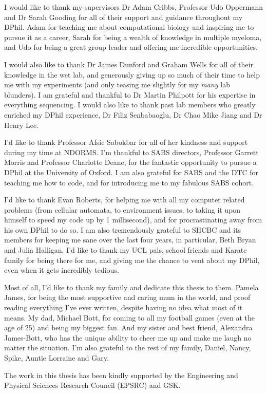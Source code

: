 I would like to thank my supervisors Dr Adam Cribbs, Professor Udo Oppermann and Dr Sarah Gooding for all of their support and guidance throughout my DPhil.
Adam for teaching me about computational biology and inspiring me to pursue it as a career, Sarah for being a wealth of knowledge in multiple myeloma, and Udo for being a great group leader and offering me incredible opportunities.

I would also like to thank Dr James Dunford and Graham Wells for all of their knowledge in the wet lab, and generously giving up so much of their time to help me with my experiments (and only teasing me slightly for my \textit{many} lab blunders).
I am grateful and thankful to Dr Martin Philpott for his expertise in everything sequencing.
I would also like to thank past lab members who greatly enriched my DPhil experience, Dr Filiz Senbabaoglu, Dr Chao Mike Jiang and Dr Henry Lee.

I'd like to thank Professor Afsie Sabokbar for all of her kindness and support during my time at NDORMS. 
I'm thankful to SABS directors, Professor Garrett Morris and Professor Charlotte Deane, for the fantastic opportunity to pursue a DPhil at the University of Oxford. 
I am also grateful for SABS and the DTC for teaching me how to code, and for introducing me to my fabulous SABS cohort. 

I'd like to thank Evan Roberts, for helping me with all my computer related problems (from cellular automata, to environment issues, to taking it upon himself to speed my code up by 1 millisecond), and for procrastinating away from his own DPhil to do so.
I am also tremendously grateful to SHCBC and its members for keeping me sane over the last four years, in particular, Beth Bryan and Julia Halligan.
I'd like to thank my UCL pals, school friends and Karate family for being there for me, and giving me the chance to vent about my DPhil, even when it gets incredibly tedious. 

Most of all, I'd like to thank my family and dedicate this thesis to them.
Pamela James, for being the most supportive and caring mum in the world, and proof reading everything I've ever written, despite having no idea what most of it means.
My dad, Michael Bott, for coming to all my football games (even at the age of 25) and being my biggest fan.
And my sister and best friend, Alexandra James-Bott, who has the unique ability to cheer me up and make me laugh no matter the situation.
I'm also grateful to the rest of my family, Daniel, Nancy, Spike, Auntie Lorraine and Gary.

The work in this thesis has been kindly supported by the Engineering and Physical Sciences Research Council (EPSRC) and GSK.